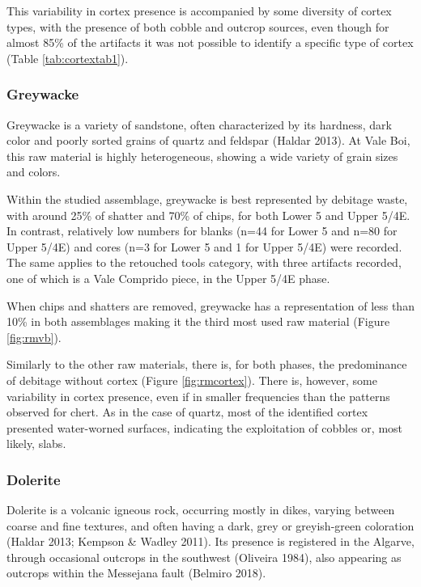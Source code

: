 \documentclass[12pt,twoside]{reedthesis}
\begin{document}
This variability in cortex presence is accompanied by some diversity of cortex types, with the presence of both cobble and outcrop sources, even though for almost 85\% of the artifacts it was not possible to identify a specific type of cortex (Table \ref{tab:cortextab1}).

\hypertarget{greywacke}{%
\subsubsection{Greywacke}\label{greywacke}}

Greywacke is a variety of sandstone, often characterized by its hardness, dark color and poorly sorted grains of quartz and feldspar (Haldar 2013). At Vale Boi, this raw material is highly heterogeneous, showing a wide variety of grain sizes and colors.

Within the studied assemblage, greywacke is best represented by debitage waste, with around 25\% of shatter and 70\% of chips, for both Lower 5 and Upper 5/4E. In contrast, relatively low numbers for blanks (n=44 for Lower 5 and n=80 for Upper 5/4E) and cores (n=3 for Lower 5 and 1 for Upper 5/4E) were recorded. The same applies to the retouched tools category, with three artifacts recorded, one of which is a Vale Comprido piece, in the Upper 5/4E phase.

When chips and shatters are removed, greywacke has a representation of less than 10\% in both assemblages making it the third most used raw material (Figure \ref{fig:rmvb}).

Similarly to the other raw materials, there is, for both phases, the predominance of debitage without cortex (Figure \ref{fig:rmcortex}). There is, however, some variability in cortex presence, even if in smaller frequencies than the patterns observed for chert. As in the case of quartz, most of the identified cortex presented water-worned surfaces, indicating the exploitation of cobbles or, most likely, slabs.

\hypertarget{dolerite}{%
\subsubsection{Dolerite}\label{dolerite}}

Dolerite is a volcanic igneous rock, occurring mostly in dikes, varying between coarse and fine textures, and often having a dark, grey or greyish-green coloration (Haldar 2013; Kempson \& Wadley 2011). Its presence is registered in the Algarve, through occasional outcrops in the southwest (Oliveira 1984), also appearing as outcrops within the Messejana fault (Belmiro 2018).
\end{document}
